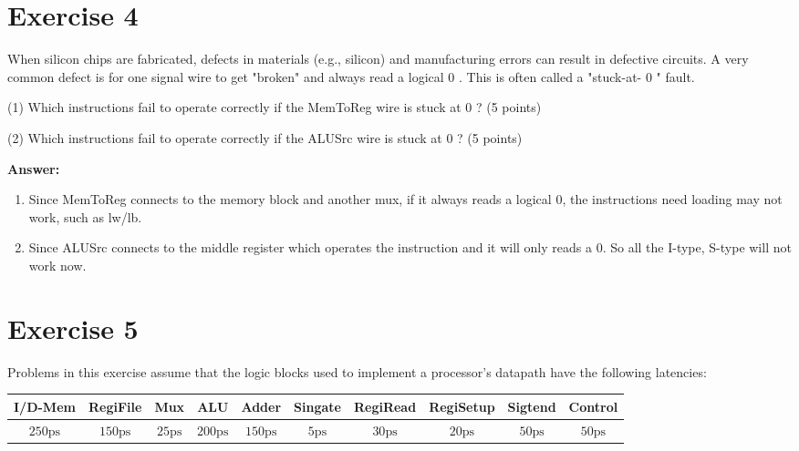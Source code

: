 \documentclass[11pt,a4paper]{article}
\begin{document}
\section*{Exercise 4}

When silicon chips are fabricated, defects in materials (e.g., silicon) and manufacturing errors can result in defective circuits. A very common defect is for one signal wire to get "broken" and always read a logical 0 . This is often called a "stuck-at- 0 " fault.

(1) Which instructions fail to operate correctly if the MemToReg wire is stuck at 0 ? (5 points)

(2) Which instructions fail to operate correctly if the ALUSrc wire is stuck at 0 ? (5 points)

\vspace{0.3cm}

\textbf{Answer:}

\begin{enumerate}[(1)]
    \item Since MemToReg connects to the memory block and another mux, if it always reads a logical 0, the instructions need loading may not work, such as lw/lb.
    \item Since ALUSrc connects to the middle register which operates the instruction and it will only reads a 0. So all the I-type, S-type will not work now.
\end{enumerate}





\section*{Exercise 5}

Problems in this exercise assume that the logic blocks used to implement a processor's datapath have the following latencies:

\vspace{0.3cm}

\begin{tabular}{|c|c|c|c|c|c|c|c|c|c|}
\hline I/D-Mem & RegiFile & Mux & ALU & Adder & Singate & RegiRead & RegiSetup & Sigtend & Control \\
\hline $250 \mathrm{ps}$ & $150 \mathrm{ps}$ & $25 \mathrm{ps}$ & $200 \mathrm{ps}$ & $150 \mathrm{ps}$ & $5 \mathrm{ps}$ & $30 \mathrm{ps}$ & $20 \mathrm{ps}$ & $50 \mathrm{ps}$ & $50 \mathrm{ps}$ \\
\hline
\end{tabular}
\end{document}
